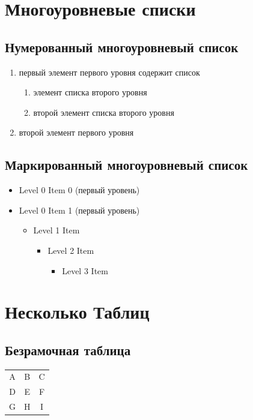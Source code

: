\documentclass{article}
\begin{document}
\section{Многоуровневые списки}

\subsection{Нумерованный многоуровневый список}
\begin{enumerate} 
  \item первый элемент первого уровня содержит список 
    \begin{enumerate} 
        \item элемент списка второго уровня
        \item второй элемент списка второго уровня
    \end{enumerate} 
  \item  второй элемент первого уровня
\end{enumerate}

\subsection{Маркированный многоуровневый список}
\begin{itemize}
  \item Level 0 Item 0 (первый уровень)
  \item Level 0 Item 1 (первый уровень)
  \begin{itemize}
    \item Level 1 Item
    \begin{itemize}
      \item Level 2 Item
      \begin{itemize}
        \item Level 3 Item
      \end{itemize}
    \end{itemize}
  \end{itemize}
\end{itemize}
\clearpage

\section{Несколько Таблиц}

\subsection{Безрамочная таблица}
\begin{tabular}{c c c}
    A & B & C \\
    D & E & F \\
    G & H & I \\
\end{tabular}
\end{document}
